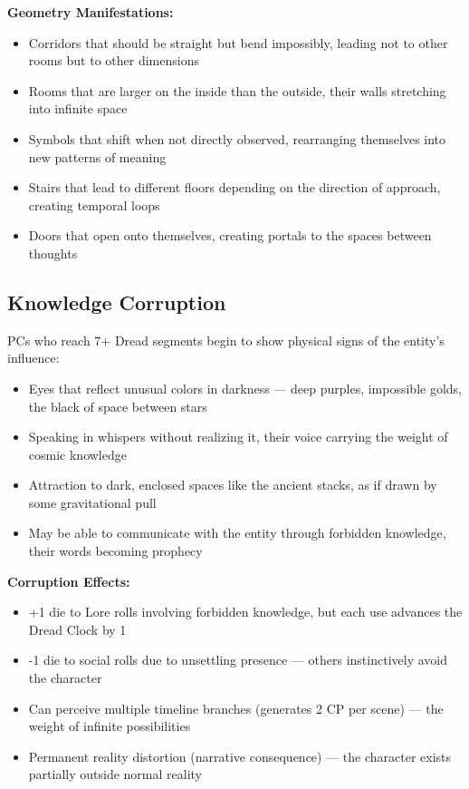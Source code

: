 \documentclass[11pt]{article}
\begin{document}
\textbf{Geometry Manifestations:}
\begin{itemize}
\item Corridors that should be straight but bend impossibly, leading not to other rooms but to other dimensions
\item Rooms that are larger on the inside than the outside, their walls stretching into infinite space
\item Symbols that shift when not directly observed, rearranging themselves into new patterns of meaning
\item Stairs that lead to different floors depending on the direction of approach, creating temporal loops
\item Doors that open onto themselves, creating portals to the spaces between thoughts
\end{itemize}

\subsection{Knowledge Corruption}

PCs who reach 7+ Dread segments begin to show physical signs of the entity's influence:
\begin{itemize}
\item Eyes that reflect unusual colors in darkness — deep purples, impossible golds, the black of space between stars
\item Speaking in whispers without realizing it, their voice carrying the weight of cosmic knowledge
\item Attraction to dark, enclosed spaces like the ancient stacks, as if drawn by some gravitational pull
\item May be able to communicate with the entity through forbidden knowledge, their words becoming prophecy
\end{itemize}

\textbf{Corruption Effects:}
\begin{itemize}
\item +1 die to Lore rolls involving forbidden knowledge, but each use advances the Dread Clock by 1
\item -1 die to social rolls due to unsettling presence — others instinctively avoid the character
\item Can perceive multiple timeline branches (generates 2 CP per scene) — the weight of infinite possibilities
\item Permanent reality distortion (narrative consequence) — the character exists partially outside normal reality
\end{itemize}
\end{document}
